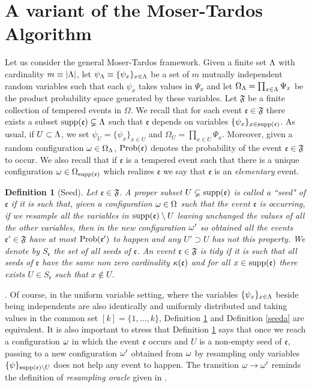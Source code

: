 \documentclass[11pt]{article}
\newcommand{\zeq}{\setcounter{equation}{0}}
\newtheorem{defi}[theo]{Definition}
\let\O=\Omega \let\P=\Pi \let\Ps=\Psi \let\Si=\Sigma \let\X=\Xi
\let\\=\noindent
\let\O=\Omega \let\P=\Pi \let\Ps=\Psi \let\Si=\Sigma \let\X=\Xi
\let\\=\noindent
\def\obj{{\rm supp}}
\def\prob{{\rm Prob}}
\def\ev{{\mathfrak{e}}}
\def\FF{{\mathfrak{F}}}
\def\Om{\Omega}
\begin{document}
\section{A variant of the Moser-Tardos Algorithm }\label{vmt}
\zeq

\\Let us consider the general Moser-Tardos framework. Given a finite set $\Lambda$ with cardinality $m\equiv|\Lambda|$, let $\psi_\Lambda\equiv \{\psi_x\}_{x\in \Lambda}$ be a set  of  $m$ mutually independent random variables such that each $\psi_x$ takes values
in $\Psi_x$ and let $\O_\L=\prod_{x\in \L}\Psi_x$
 be the product probability space generated by these variables. Let $\FF$ be a finite collection of tempered events in $\O$. We recall that for each event $\ev \in \FF$ there exists a subset $\obj(\ev) \varsubsetneq \L$   such that $\ev$ depends on variables $\{\psi_x\}_{x\in \obj(\ev)}$. As usual,  if $U\subset \Lambda$, we set $\psi_U=\{\psi_x\}_{x\in U}$ and
 $\O_U= \prod_{x\in U}\Psi_x$. Moreover,
given a random configuration $\o\in \O_\L$,  $\prob(\ev)$ denotes  the probability
 of the event $\ev\in \FF$ to occur.  We also recall that if $\ev$ is a tempered event such that there is a unique configuration  $\omega \in \Om_{\obj(\ev)}$ which realizes $\ev$ we say that $\ev$ is an {\it elementary} event.



\begin{defi}[Seed]\label{seed}
Let $\ev\in \FF$. A proper subset $U \varsubsetneq \obj(\ev)$ is called a ``seed" of $\ev$ if  it is  such that,  given
a configuration $\o\in \O$ such that the event $\ev$ is occurring, if we resample all the variables in $\obj(\ev) \setminus U$ leaving unchanged the values of all the other variables, then in the new configuration
$\omega'$ so obtained all the events $\ev' \in \FF$ have at most $\prob(\ev')$ to happen and any $U'\supset U$ has not this property. We denote by $S_{\ev}$ the set of all seeds of $\ev$.
An event $\ev\in \FF$ is tidy if it is such that all seeds of $\ev$ have the same non zero cardinality $\k(\ev)$ and for all $x\in \obj(\ev)$ there exists $U\in S_\ev$ such that $x\notin U$.
\end{defi}


\\{\bf Remark}\label{od}.
 Of course,  in the uniform variable setting, where the variables $\{\psi_x\}_{x\in \Lambda}$ beside being independents are also identically and uniformly distributed and taking values in the common  set $[k]=\{1, \dots, k\}$,  Definition \ref{seed} and  Definition \ref{seeda} are equivalent. It is also important to stress  that
Definition \ref{seed} says that once we reach a configuration $\omega$ in which  the event $\ev$ occurs and $U$ is a non-empty seed of $\ev$, passing to a new configuration $\omega'$  obtained from $\omega$ by resampling only variables
$\{\psi\}_{\obj(\ev)\setminus U}$  does not help any event to happen. The transition $\omega\to\omega'$ reminds the definition of {\it resampling oracle} given in \cite{HV}.
\end{document}
